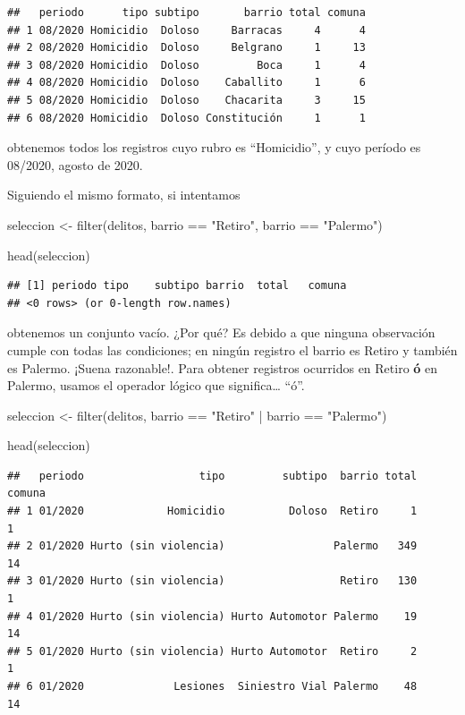 \documentclass[
]{book}
\newenvironment{Shaded}{\begin{snugshade}}{\end{snugshade}}
\newcommand{\FunctionTok}[1]{\textcolor[rgb]{0.00,0.00,0.00}{#1}}
\newcommand{\NormalTok}[1]{#1}
\newcommand{\OtherTok}[1]{\textcolor[rgb]{0.56,0.35,0.01}{#1}}
\newcommand{\SpecialCharTok}[1]{\textcolor[rgb]{0.00,0.00,0.00}{#1}}
\newcommand{\StringTok}[1]{\textcolor[rgb]{0.31,0.60,0.02}{#1}}
\begin{document}
\begin{verbatim}
##   periodo      tipo subtipo       barrio total comuna
## 1 08/2020 Homicidio  Doloso     Barracas     4      4
## 2 08/2020 Homicidio  Doloso     Belgrano     1     13
## 3 08/2020 Homicidio  Doloso         Boca     1      4
## 4 08/2020 Homicidio  Doloso    Caballito     1      6
## 5 08/2020 Homicidio  Doloso    Chacarita     3     15
## 6 08/2020 Homicidio  Doloso Constitución     1      1
\end{verbatim}

obtenemos todos los registros cuyo rubro es ``Homicidio'', y cuyo período es 08/2020, agosto de 2020.

Siguiendo el mismo formato, si intentamos

\begin{Shaded}
\begin{Highlighting}[]
\NormalTok{seleccion }\OtherTok{\textless{}{-}} \FunctionTok{filter}\NormalTok{(delitos, barrio }\SpecialCharTok{==} \StringTok{"Retiro"}\NormalTok{, barrio }\SpecialCharTok{==} \StringTok{"Palermo"}\NormalTok{)}

\FunctionTok{head}\NormalTok{(seleccion)}
\end{Highlighting}
\end{Shaded}

\begin{verbatim}
## [1] periodo tipo    subtipo barrio  total   comuna 
## <0 rows> (or 0-length row.names)
\end{verbatim}

obtenemos un conjunto vacío. ¿Por qué? Es debido a que ninguna observación cumple con todas las condiciones; en ningún registro el barrio es Retiro y también es Palermo. ¡Suena razonable!. Para obtener registros ocurridos en Retiro \textbf{ó} en Palermo, usamos el operador lógico \texttt{\textbar{}} que significa\ldots{} ``ó''.

\begin{Shaded}
\begin{Highlighting}[]
\NormalTok{seleccion }\OtherTok{\textless{}{-}} \FunctionTok{filter}\NormalTok{(delitos, barrio }\SpecialCharTok{==} \StringTok{"Retiro"} \SpecialCharTok{|}\NormalTok{ barrio }\SpecialCharTok{==} \StringTok{"Palermo"}\NormalTok{)}

\FunctionTok{head}\NormalTok{(seleccion)}
\end{Highlighting}
\end{Shaded}

\begin{verbatim}
##   periodo                  tipo         subtipo  barrio total comuna
## 1 01/2020             Homicidio          Doloso  Retiro     1      1
## 2 01/2020 Hurto (sin violencia)                 Palermo   349     14
## 3 01/2020 Hurto (sin violencia)                  Retiro   130      1
## 4 01/2020 Hurto (sin violencia) Hurto Automotor Palermo    19     14
## 5 01/2020 Hurto (sin violencia) Hurto Automotor  Retiro     2      1
## 6 01/2020              Lesiones  Siniestro Vial Palermo    48     14
\end{verbatim}
\end{document}

